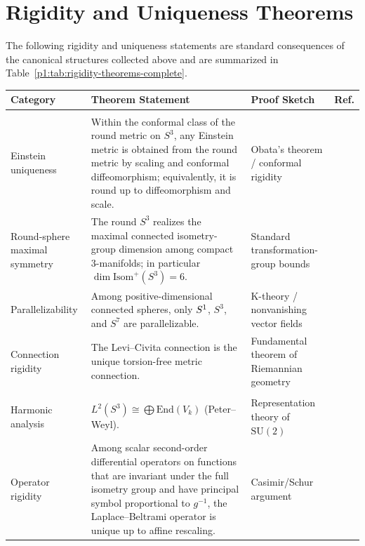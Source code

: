 \documentclass[11pt]{article}
\begin{document}
\section{Rigidity and Uniqueness Theorems}
\label{p1:sec:rigidity-theorems}
The following rigidity and uniqueness statements are standard consequences of the canonical structures collected above and are summarized in Table~\ref{p1:tab:rigidity-theorems-complete}.
\begin{table}[p]
\centering
\begingroup
\scriptsize
\setlength{\tabcolsep}{3pt}
\renewcommand{\arraystretch}{1.28}
\begin{tabular}{|>{\raggedright\arraybackslash}p{2.7cm}|>{\raggedright\arraybackslash}p{6.1cm}|>{\raggedright\arraybackslash}p{4.5cm}|>{\raggedright\arraybackslash}p{1.7cm}|}
\hline
\textbf{Category} & \textbf{Theorem Statement} & \textbf{Proof Sketch} & \textbf{Ref.} \\
\hline
\multicolumn{4}{|c|}{\textit{Geometric Rigidity}} \\
\hline
Einstein uniqueness & Within the conformal class of the round metric on \(S^3\), any Einstein metric is obtained from the round metric by scaling and conformal diffeomorphism; equivalently, it is round up to diffeomorphism and scale. & \raggedright Obata's theorem / conformal rigidity & \cite{Obata1962} \\
\hline
Round-sphere maximal symmetry & The round \(S^3\) realizes the maximal connected isometry-group dimension among compact \(3\)-manifolds; in particular \(\dim \mathrm{Isom}^+(S^3)=6\). & \raggedright Standard transformation-group bounds & \cite{Kobayashi1972} \\
\hline
Parallelizability & Among positive-dimensional connected spheres, only \(S^1\), \(S^3\), and \(S^7\) are parallelizable. & \raggedright K-theory / nonvanishing vector fields & \cite{Adams1960} \\
\hline
Connection rigidity & The Levi--Civita connection is the unique torsion-free metric connection. & \raggedright Fundamental theorem of Riemannian geometry & \cite{levi1927fondamenti} \\
\hline
\multicolumn{4}{|c|}{\textit{Analytic \& Spectral Rigidity}} \\
\hline
Harmonic analysis & \(L^2(S^3) \cong \bigoplus \mathrm{End}(V_k)\) (Peter--Weyl). & \raggedright Representation theory of \(\mathrm{SU}(2)\) & \cite{Peter1927} \\
\hline
Operator rigidity & Among scalar second-order differential operators on functions that are invariant under the full isometry group and have principal symbol proportional to \(g^{-1}\), the Laplace--Beltrami operator is unique up to affine rescaling. & \raggedright Casimir/Schur argument & \cite{helgason1984groups} \\

\end{tabular}
\end{table}
\end{document}
